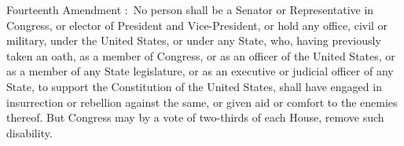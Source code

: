 \documentclass[preview,border=0.80001bp, convert=imagemagick]{standalone}
\begin{document}
\parbox[t][1.25in][l]{300pt}{
	\fmmfamily
	Fourteenth Amendment :\ 
	No person shall be a Senator or Representative in Congress, or
	elector of President and Vice-President, or hold any office, civil
	or military, under the United States, or under any State, who,
	having previously taken an oath, as a member of Congress, or as an
	officer of the United States, or as a member of any State
	legislature, or as an executive or judicial officer of any State, to
	support the Constitution of the United States, shall have engaged in
	insurrection or rebellion against the same, or given aid or comfort
	to the enemies thereof. But Congress may by a vote of two-thirds of
	each House, remove such disability.
}
\end{document}
